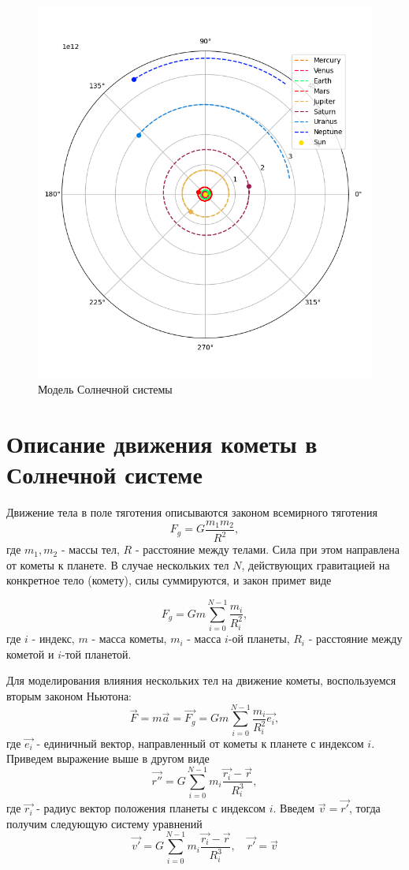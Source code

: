 \begin{figure}[h!]
	\centering
	\includegraphics[width=0.5\linewidth]{imgs_8/solar.png}
	\caption{Модель Солнечной системы}
    \label{fig:system}
\end{figure}


\section{Описание движения кометы в Солнечной системе}
Движение тела в поле тяготения описываются законом всемирного тяготения
\begin{equation}
	F_g = G\frac{m_1 m_2}{R^2},
\end{equation}
где $m_1, m_2$ - массы тел, $R$ - расстояние между телами. Сила при этом направлена от кометы к планете.
В случае нескольких тел $N$, действующих
гравитацией на конкретное тело (комету), силы суммируются, и закон примет виде

\begin{equation}
	F_g = G m \sum_{i=0}^{N-1}\frac{m_i}{R_i^2},
\end{equation}
где $i$ - индекс, $m$ - масса кометы, $m_i$ - масса $i$-ой планеты, $R_i$ - расстояние между
кометой и $i$-той планетой.

Для моделирования влияния нескольких тел на движение кометы, воспользуемся вторым законом Ньютона:
\begin{equation}
	\vec{F} = m\vec{a} = \vec{F_g} = G m \sum_{i=0}^{N-1}\frac{m_i}{R_i^2}\vec{e_i},
\end{equation}
где $\vec{e_i}$ - единичный вектор, направленный от кометы к планете с индексом $i$.
Приведем выражение выше в другом виде
\begin{equation}
    \vec{r''} = G \sum_{i=0}^{N-1}m_i\frac{\vec{r_i}-\vec{r}}{R_i^3},
\end{equation}
где $\vec{r_i}$ - радиус вектор положения планеты с индексом $i$. Введем $\vec{v} = \vec{r'}$,
тогда получим следующую систему уравнений
\begin{equation}
	\vec{v'} = G \sum_{i=0}^{N-1}m_i\frac{\vec{r_i}-\vec{r}}{R_i^3}, \quad
	\vec{r'} = \vec{v}
\end{equation}

